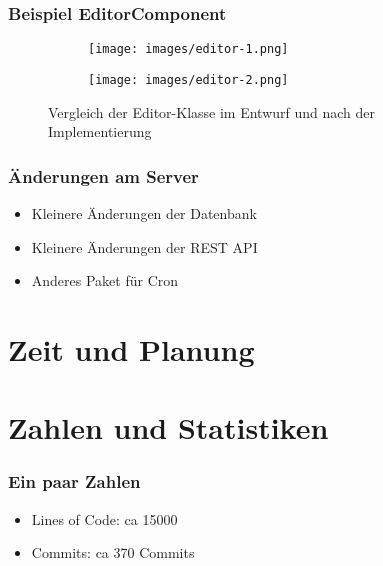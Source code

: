 \documentclass[11pt, usepdftitle=false,...]{beamer}
\begin{document}
    	\begin{frame}
    		\frametitle{Beispiel EditorComponent}
    		
    		\begin{figure}[h]
                \begin{subfigure}{0.3\textwidth}
                    \texttt{[image: images/editor-1.png]} 
                \end{subfigure}
                \begin{subfigure}{0.3\textwidth}
                    \texttt{[image: images/editor-2.png]}
                \end{subfigure}
                \caption{Vergleich der Editor-Klasse im Entwurf und nach der Implementierung}
                \label{fig:compateEditor}
            \end{figure}
            
    	\end{frame}
    	
	    \begin{frame}
	        \frametitle{Änderungen am Server}
	        \begin{itemize}
	            \item<2-> Kleinere Änderungen der Datenbank
	            \item<3-> Kleinere Änderungen der REST API
	            \item<4-> Anderes Paket für Cron
	        \end{itemize}
	    \end{frame}    	

	\section{Zeit und Planung}
	\frame{\sectionpage}
	
	\section{Zahlen und Statistiken}
	\frame{\sectionpage}
	
			\begin{frame}
				\frametitle{Ein paar Zahlen}
				\begin{itemize}
					\item<2-> Lines of Code: ca 15000
					\item<3-> Commits: ca 370 Commits
				\end{itemize}	
			\end{frame}
			
\end{document}
